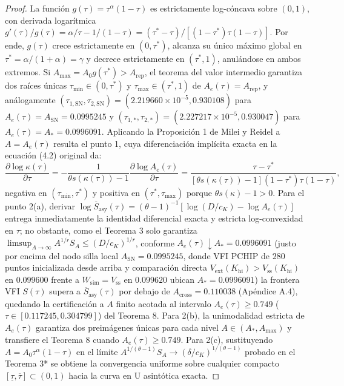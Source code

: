 \documentclass[11pt,letterpaper]{article}
\theoremstyle{plain}
\begin{document}
\begin{proof}
La función $g(\tau)=\tau^\alpha(1-\tau)$ es estrictamente log-cóncava sobre $(0,1)$, con derivada logarítmica $g'(\tau)/g(\tau)=\alpha/\tau - 1/(1-\tau) = (\tau^*-\tau)/[(1-\tau^*)\tau(1-\tau)]$. Por ende, $g(\tau)$ crece estrictamente en $(0,\tau^*)$, alcanza su único máximo global en $\tau^*=\alpha/(1+\alpha)=\gamma$ y decrece estrictamente en $(\tau^*,1)$, anulándose en ambos extremos. Si $A_{\max}=A_0 g(\tau^*)>A_{\mathrm{rep}}$, el teorema del valor intermedio garantiza dos raíces únicas $\tau_{\min}\in(0,\tau^*)$ y $\tau_{\max}\in(\tau^*,1)$ de $A_e(\tau)=A_{\mathrm{rep}}$, y análogamente $(\tau_{1,\mathrm{SN}},\tau_{2,\mathrm{SN}})=(2.219660\times 10^{-5}, 0.930108)$ para $A_e(\tau)=A_{\mathrm{SN}}=0.0995245$ y $(\tau_{1,*},\tau_{2,*})=(2.227217\times 10^{-5}, 0.930047)$ para $A_e(\tau)=A_*=0.0996091$. Aplicando la Proposición 1 de Milei y Reidel a $A=A_e(\tau)$ resulta el punto 1, cuya diferenciación implícita exacta en la ecuación (4.2) original da:
\[
\frac{\partial\log\kappa(\tau)}{\partial\tau} = -\frac{1}{\theta s(\kappa(\tau))-1}\frac{\partial\log A_e(\tau)}{\partial\tau} = \frac{\tau-\tau^*}{[\theta s(\kappa(\tau))-1](1-\tau^*)\tau(1-\tau)},
\]
negativa en $(\tau_{\min},\tau^*)$ y positiva en $(\tau^*,\tau_{\max})$ porque $\theta s(\kappa)-1>0$. Para el punto 2(a), derivar $\log\overline{S}_{\mathrm{asy}}(\tau)=(\theta-1)^{-1}[\log(D/c_K)-\log A_e(\tau)]$ entrega inmediatamente la identidad diferencial exacta y estricta log-convexidad en $\tau$; no obstante, como el Teorema 3 solo garantiza $\limsup_{A\to\infty}A^{1/r}S_A\le (D/c_K)^{1/r}$, conforme $A_e(\tau)\downarrow A_*=0.0996091$ (justo por encima del nodo silla local $A_{\mathrm{SN}}=0.0995245$, donde VFI PCHIP de $280$ puntos inicializada desde arriba y comparación directa $V_{\mathrm{ext}}(K_{\mathrm{hi}})>V_{\mathrm{ss}}(K_{\mathrm{hi}})$ en $0.099600$ frente a $W_{\mathrm{sim}}=V_{\mathrm{ss}}$ en $0.099620$ ubican $A_*=0.0996091$) la frontera VFI $S(\tau)$ supera a $\overline{S}_{\mathrm{asy}}(\tau)$ por debajo de $A_{\mathrm{cross}}=0.110038$ (Apéndice A.4), quedando la certificación a $A$ finito acotada al intervalo $A_e(\tau)\ge 0.749$ ($\tau\in[0.117245, 0.304799]$) del Teorema 8. Para 2(b), la unimodalidad estricta de $A_e(\tau)$ garantiza dos preimágenes únicas para cada nivel $A\in(A_*, A_{\max})$ y transfiere el Teorema 8 cuando $A_e(\tau)\ge 0.749$. Para 2(c), sustituyendo $A=A_0\tau^\alpha(1-\tau)$ en el límite $A^{1/(\theta-1)}S_A\to (\delta/c_K)^{1/(\theta-1)}$ probado en el Teorema 3* se obtiene la convergencia uniforme sobre cualquier compacto $[\underline{\tau},\overline{\tau}]\subset(0,1)$ hacia la curva en U asintótica exacta.
\end{proof}
\end{document}
